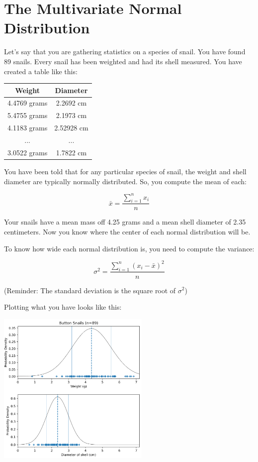 \chapter{The Multivariate Normal Distribution}

Let's say that you are gathering statistics on a species of snail. You have found 89 snails.
Every snail has been weighted and had its shell measured. You have created a table like this:

\begin{tabular}{ c c }
Weight & Diameter \\
\hline
4.4769 grams & 2.2692 cm\\
5.4755 grams & 2.1973 cm\\
4.1183 grams & 2.52928 cm\\
... & ... \\
3.0522 grams & 1.7822 cm
\end{tabular}


You have been told that for any particular species of snail, the weight and shell diameter are typically normally distributed.
So, you compute the mean of each:

$$\bar{x} = \frac{\sum_{i=1}^{n} x_i}{n}$$

Your snails have a mean mass off 4.25 grams and a mean shell diameter of 2.35 centimeters.
Now you know where the center of each normal distribution will be.

To know how wide each normal distribution is, you need to compute the variance:

$$\sigma^2 = \frac{\sum_{i=1}^{n} (x_i - \bar{x})^2}{n}$$

(Reminder: The standard deviation is the square root of $\sigma^2$)

Plotting what you have looks like this:

\includegraphics[width=0.55\textwidth]{separate.png}

